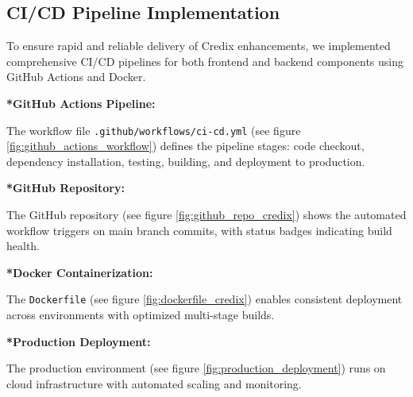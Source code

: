 \vspace{20cm}

\subsection{CI/CD Pipeline Implementation}

To ensure rapid and reliable delivery of Credix enhancements, we implemented comprehensive CI/CD pipelines for both frontend and backend components using GitHub Actions and Docker.

\noindent\textbf{*GitHub Actions Pipeline:}

The workflow file \texttt{.github/workflows/ci-cd.yml} (see figure \ref{fig:github_actions_workflow}) defines the pipeline stages: code checkout, dependency installation, testing, building, and deployment to production.


\noindent\textbf{*GitHub Repository:}

The GitHub repository (see figure \ref{fig:github_repo_credix}) shows the automated workflow triggers on main branch commits, with status badges indicating build health.


\noindent\textbf{*Docker Containerization:}

The \texttt{Dockerfile} (see figure \ref{fig:dockerfile_credix}) enables consistent deployment across environments with optimized multi-stage builds.


\noindent\textbf{*Production Deployment:}

The production environment (see figure \ref{fig:production_deployment}) runs on cloud infrastructure with automated scaling and monitoring.

